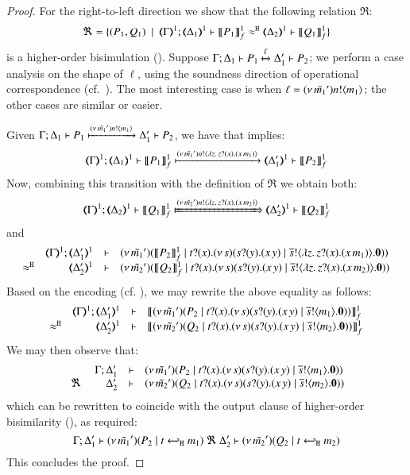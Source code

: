 \begin{proof}
	\noi For the right-to-left direction we show that the following relation $\Re$:
%
	\[
		\Re = \set{
		(P_1, Q_1) 
		\setbar \horel{\mapt{\Gamma}^{1}}{\mapt{\Delta_1}^{1}}{\pmapp{P_1}{1}{f}}{\hwb}{\mapt{\Delta_2}^{1}}{\pmapp{Q_1}{1}{f}}}
	\]
	is a higher-order bisimulation ().
%
Suppose $\Gamma; \Delta_1 \vdash P_1 \xmapsto{\ell} \Delta_1' \vdash P_2$; 
we perform a case analysis on the shape of ${\ell}$, using 
the soundness direction of operational correspondence (cf.~).
		The  most interesting case is when $\ell = (\nu\, \tilde{m_1}') n ! \langle m_1 \rangle$; the other cases are similar or easier.

\bigskip

	\noi Given $\Gamma; \Delta_1 \vdash P_1 \xmapsto{(\nu\, \tilde{m_1}') n !\langle m_1 \rangle} \Delta_1' \vdash P_2$, 
	we have that  implies:
%
	\[
		\horel{\mapt{\Gamma}^{1}}{\mapt{\Delta_1}^{1}}{\pmapp{P_1}{1}{f}}{\hby{\news{\tilde{m_1}'} \bactout{n}{\abs{z}{\binp{z}{x} (\appl{x}{m_1})}}}}{\mapt{\Delta_1'}^{1}}{\pmapp{P_2}{1}{f}}
	\]
%
	\noi Now, combining this transition with the definition of $\Re$ we obtain both:
%
$$
		\horel{\mapt{\Gamma}^{1}}{\mapt{\Delta_2}^{1}}{\pmapp{Q_1}{1}{f}}{\Hby{\news{\tilde{m_2}'} \bactout{n}{\abs{z}{\binp{z}{x} (\appl{x}{m_2})}}}}{\mapt{\Delta_2'}^{1}}{\pmapp{Q_2}{1}{f}}
		\label{prop:HOp_to_HO:full_abs11}
$$
%
	\noi and
$$
		\mhorel	{\mapt{\Gamma}^{1}}
			{\mapt{\Delta_1'}^{1}}
			{\newsp{\tilde{m_1}'}{\pmapp{P_2}{1}{f}  \Par \hotrigger{t}{x}{s}{\abs{z}{\binp{z}{x} (\appl{x}{m_1})}} }}
			{\hwb}
			{\mapt{\Delta_2'}^{1}}
			{}
			{\newsp{\tilde{m_2}'}{\pmapp{Q_2}{1}{f} \Par \hotrigger{t}{x}{s}{\abs{z}{\binp{z}{x} (\appl{x}{m_2})}}}}
$$
	\noi Based on the encoding  (cf. ), we may rewrite the above equality as follows:
	\[
		\mhorel{\mapt{\Gamma}^{1}}{\mapt{\Delta_1'}^{1}}{\pmapp{\newsp{\tilde{m_1}'}{P_2 
			\Par \hotrigger{t}{x}{s}{m_1}}}{1}{f}}
		{\hwb}{\mapt{\Delta_2'}^{1}}{}{\pmapp{\newsp{\tilde{m_2}'}{Q_2 \Par \hotrigger{t}{x}{s}{m_2}}}{1}{f}}
	\]
%
	\noi We may then observe that:
$$
		\mhorel{\Gamma}{\Delta_1'}{\newsp{\tilde{m_1}'}{P_2 \Par \hotrigger{t}{x}{s}{m_1}}}
		{\ \Re\ }{\Delta_2'}{}{\newsp{\tilde{m_2}'}{Q_2 \Par \hotrigger{t}{x}{s}{m_2}}}
$$
	which can be rewritten to coincide with the output clause of higher-order bisimilarity (), as required:
$$
		\Gamma; \Delta_1' \vdash (\nu\, \tilde{m_1}')(P_2 \;|\; t \hookleftarrow_{\mathtt{H}} m_1) \ \Re\  \Delta_2' \vdash{(\nu\, \tilde{m_2}')(Q_2 \;|\;t \hookleftarrow_{\mathtt{H}} m_2)}
$$
This concludes the proof.
\bigskip


\end{proof}
